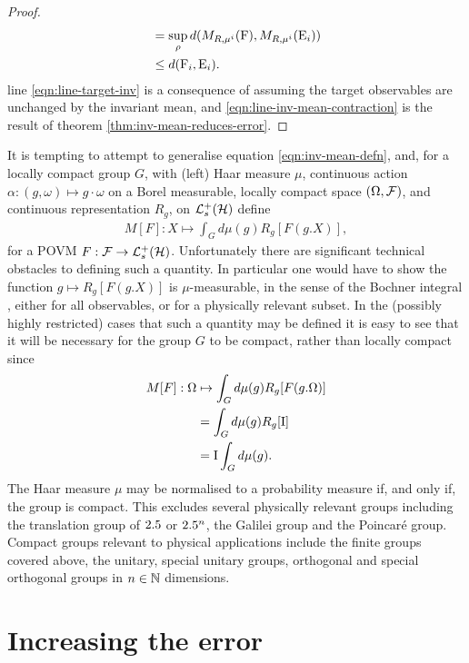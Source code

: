 \begin{thm}
\begin{proof}
\begin{align}
      \label{eqn:line-target-inv}
                                           &= \sup_\rho d(M_{R, \mu^i}(\operatorname{F}),  M_{R, \mu^i}(\operatorname{E}_i))\\
      \label{eqn:line-inv-mean-contraction}
                                           &\leq d(\operatorname{F}_i, \operatorname{E}_i).
    \end{align}
    line \eqref{eqn:line-target-inv} is a consequence of assuming the target observables are unchanged by the invariant mean, and \eqref{eqn:line-inv-mean-contraction} is the result of theorem \ref{thm:inv-mean-reduces-error}.
  \end{proof}
\end{thm}

It is tempting to attempt to generalise equation \ref{eqn:inv-mean-defn}, and, for a locally compact group $G$, with (left) Haar measure $\mu$, continuous action $\alpha: (g,\omega)\mapsto g\cdot\omega$ on a Borel measurable, locally compact space $(\Omega, \mathcal{F})$, and continuous representation $R_g$, on $\posops[\hcal]$ define
\begin{align}
  M[F]: X\mapsto\int_G d\mu(g) R_g[F(g.X)],
\end{align}
for a POVM $F:\fcal\to\posops[\hcal]$. Unfortunately there are significant technical obstacles to defining such a quantity. In particular one would have to show the function $g\mapsto R_g[F(g.X)]$ is $\mu$-measurable, in the sense of the Bochner integral \cite{measure-theory-cohn}, either for all observables, or for a physically relevant subset. In the (possibly highly restricted) cases that such a quantity may be defined it is easy to see that it will be necessary for the group $G$ to be compact, rather than locally compact since
\begin{align}
  M[F]:\Omega&\mapsto\int_G d\mu(g) R_g[F(g.\Omega)]\\
             &=\int_G d\mu(g) R_g[\operatorname{I}]\\
             &=\operatorname{I}\int_G d\mu(g).\label{eqn:inv-mean-identity-infinite-case}
\end{align}
The Haar measure $\mu$ may be normalised to a probability measure if, and only if, the group is compact. This excludes several physically relevant groups including the translation group of $2.5$ or $2.5^n$, the Galilei group and the Poincar{\'e} group. Compact groups relevant to physical applications include the finite groups covered above, the unitary, special unitary groups, orthogonal and special orthogonal groups in $n\in\mathbb{N}$ dimensions.

\section{Increasing the error}
\label{sec:inc-error}

